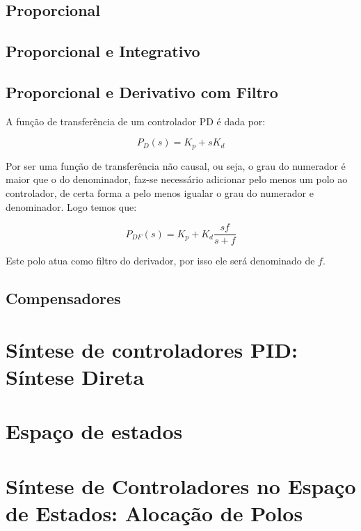 	    \subsection{Proporcional}
	    
	    
	    \subsection{Proporcional e Integrativo}
	    
	    \subsection{Proporcional e Derivativo com Filtro}
	        
	        A função de transferência de um controlador PD é dada por:
	        
	        \begin{equation}
	            P_D(s) = K_p + s K_d 
	        \end{equation}
	        
	        Por ser uma função de transferência não causal, ou seja, o grau do numerador é maior que o do denominador, faz-se necessário adicionar pelo menos um polo ao controlador, de certa forma a pelo menos igualar o grau do numerador e denominador. Logo temos que:
	        
	        \begin{equation}
	            P_{DF}(s) = K_p + K_d \frac{sf}{s+f}
	            \label{eq:pdf}
	        \end{equation}
	        
	        Este polo atua como filtro do derivador, por isso ele será denominado de $f$.
	        
	        \subsection{Compensadores}
	  
    \section{Síntese de controladores PID: Síntese Direta}
	
    \section{Espaço de estados}
    
    \section{Síntese de Controladores no Espaço de Estados: Alocação de Polos}

	
